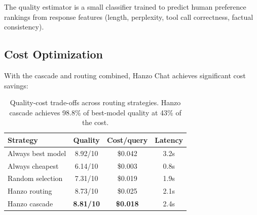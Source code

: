 The quality estimator is a small classifier trained to predict human preference rankings from response features (length, perplexity, tool call correctness, factual consistency).

\subsection{Cost Optimization}

With the cascade and routing combined, Hanzo Chat achieves significant cost savings:

\begin{table}[H]
\centering
\small
\begin{tabular}{lccc}
\toprule
\textbf{Strategy} & \textbf{Quality} & \textbf{Cost/query} & \textbf{Latency} \\
\midrule
Always best model & 8.92/10 & \$0.042 & 3.2s \\
Always cheapest & 6.14/10 & \$0.003 & 0.8s \\
Random selection & 7.31/10 & \$0.019 & 1.9s \\
Hanzo routing & 8.73/10 & \$0.025 & 2.1s \\
Hanzo cascade & \textbf{8.81/10} & \textbf{\$0.018} & 2.4s \\
\bottomrule
\end{tabular}
\caption{Quality-cost trade-offs across routing strategies. Hanzo cascade achieves 98.8\% of best-model quality at 43\% of the cost.}
\label{tab:routing_cost}
\end{table}

